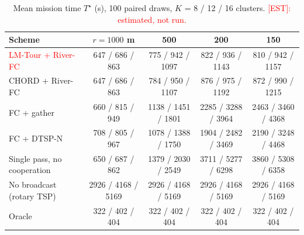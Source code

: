 \begin{table}[t]\centering\color{blue}\caption{Mean mission time $T^\star$ (s), 100 paired draws, $K$ = 8 / 12 / 16 clusters. \textcolor{red}{[EST]: estimated, not run.}}\label{tab:tstar}
\setlength{\tabcolsep}{3pt}\footnotesize
\begin{tabular}{lcccc}\toprule
Scheme & $r=1000$ m & 500 & 200 & 150 \\\midrule
\textcolor{red}{LM-Tour + River-FC} & 647 / 686 / 863 & 775 / 942 / 1097 & 822 / 936 / 1143 & 810 / 942 / 1157 \\
{CHORD + River-FC} & 647 / 686 / 863 & 784 / 950 / 1107 & 876 / 975 / 1192 & 872 / 990 / 1215 \\
{FC + gather} & 660 / 815 / 949 & 1138 / 1451 / 1801 & 2285 / 3288 / 3964 & 2463 / 3460 / 4368 \\
{FC + DTSP-N} & 708 / 805 / 967 & 1078 / 1388 / 1750 & 1904 / 2482 / 3469 & 2190 / 3248 / 4468 \\
{Single pass, no cooperation} & 650 / 687 / 862 & 1379 / 2030 / 2549 & 3711 / 5277 / 6298 & 3860 / 5308 / 6358 \\
{No broadcast (rotary TSP)} & 2926 / 4168 / 5169 & 2926 / 4168 / 5169 & 2926 / 4168 / 5169 & 2926 / 4168 / 5169 \\
{Oracle} & 322 / 402 / 404 & 322 / 402 / 404 & 322 / 402 / 404 & 322 / 402 / 404 \\
\bottomrule\end{tabular}\end{table}
